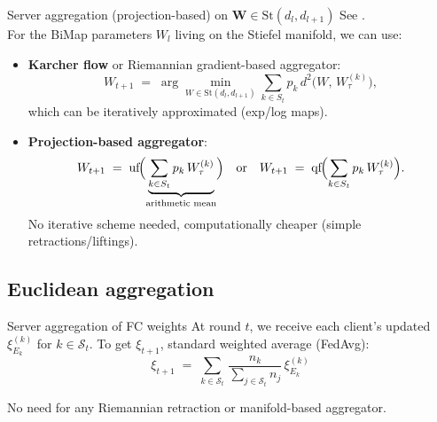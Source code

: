 \documentclass[aspectratio=169,xcolor=dvipsnames]{beamer}
\begin{document}



\begin{frame}{Server aggregation (projection-based) on \(\mathbf{W}\in \mathrm{St}(d_l,d_{l+1})\)}
See \cite{bouchard2025beyond}. \\For the BiMap parameters \(W_l\) living on the Stiefel manifold, we can use:

\begin{itemize}
    \item \textbf{Karcher flow} or Riemannian gradient-based aggregator: 
    \[
      W_{t+1}
      \;=\;
      \arg\!\min_{W\in \mathrm{St}(d_l,d_{l+1})}
      \sum_{k\in S_t} p_k\,d^2\bigl(W,\,W_{\tau}^{(k)}\bigr),
    \]
    which can be iteratively approximated (exp/log maps).
    \item \textbf{Projection-based aggregator}:
    \[
      W_{t+1}
      \;=\; \mathrm{uf}\!\Bigl(\underbrace{\sum_{k\in S_t}p_k\,W_{\tau}^{(k)}}_{\text{arithmetic mean}}\Bigr)
      \quad\text{or}\quad
      W_{t+1}
      \;=\; \mathrm{qf}\!\Bigl(\sum_{k\in S_t}p_k\,W_{\tau}^{(k)}\Bigr).
    \]
     No iterative scheme needed, computationally cheaper (simple retractions/liftings).
\end{itemize}
\end{frame}
\subsection{Euclidean aggregation}


\begin{frame}{Server aggregation of FC weights}
At round $t$, we receive each client’s updated $\xi_{E_k}^{(k)}$ for $k \in \mathcal{S}_t$.  
To get $\xi_{t+1}$,  standard weighted average (FedAvg):
\[
   \xi_{t+1}
   \;=\; \sum_{k\in \mathcal{S}_t} \, \frac{n_k}{\sum_{j\in \mathcal{S}_t}n_j}\,\xi_{E_k}^{(k)}
\]

\vspace{.5em}

No need for any Riemannian retraction or manifold-based aggregator.  
\end{frame}

\end{document}
